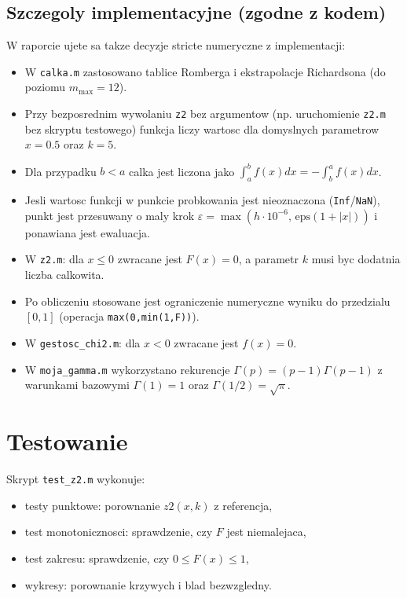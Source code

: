 \documentclass[12pt,a4paper]{article}
\begin{document}
\subsection{Szczegoly implementacyjne (zgodne z kodem)}
W raporcie ujete sa takze decyzje stricte numeryczne z implementacji:
\begin{itemize}
  \item W \texttt{calka.m} zastosowano tablice Romberga i ekstrapolacje Richardsona
  (do poziomu $m_{\max}=12$).
  \item Przy bezposrednim wywolaniu \texttt{z2} bez argumentow
  (np. uruchomienie \texttt{z2.m} bez skryptu testowego) funkcja liczy wartosc
  dla domyslnych parametrow $x=0.5$ oraz $k=5$.
  \item Dla przypadku $b<a$ calka jest liczona jako
  $\int_a^b f(x)dx = -\int_b^a f(x)dx$.
  \item Jesli wartosc funkcji w punkcie probkowania jest nieoznaczona
  (\texttt{Inf}/\texttt{NaN}), punkt jest przesuwany o maly krok
  $\varepsilon = \max(h\cdot10^{-6},\,\mathrm{eps}(1+|x|))$ i ponawiana jest ewaluacja.
  \item W \texttt{z2.m}: dla $x \le 0$ zwracane jest $F(x)=0$,
  a parametr $k$ musi byc dodatnia liczba calkowita.
  \item Po obliczeniu stosowane jest ograniczenie numeryczne wyniku do przedzialu
  $[0,1]$ (operacja \texttt{max(0,min(1,F))}).
  \item W \texttt{gestosc\_chi2.m}: dla $x<0$ zwracane jest $f(x)=0$.
  \item W \texttt{moja\_gamma.m} wykorzystano rekurencje
  $\Gamma(p)=(p-1)\Gamma(p-1)$ z warunkami bazowymi
  $\Gamma(1)=1$ oraz $\Gamma(1/2)=\sqrt{\pi}$.
\end{itemize}

\section{Testowanie}
Skrypt \texttt{test\_z2.m} wykonuje:
\begin{itemize}
  \item testy punktowe: porownanie $z2(x,k)$ z referencja,
  \item test monotonicznosci: sprawdzenie, czy $F$ jest niemalejaca,
  \item test zakresu: sprawdzenie, czy $0 \le F(x) \le 1$,
  \item wykresy: porownanie krzywych i blad bezwzgledny.
\end{itemize}
\end{document}
